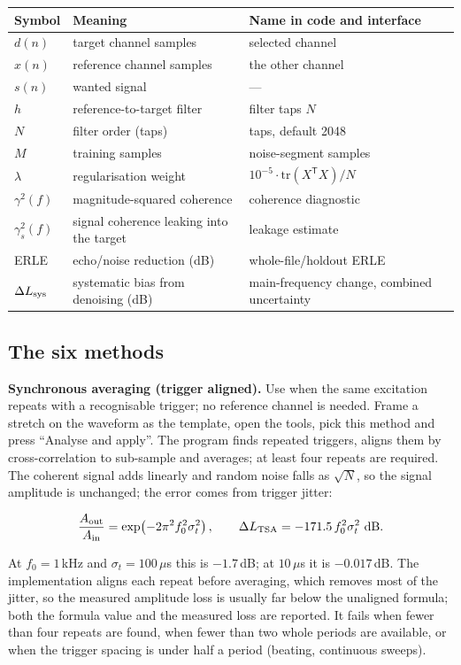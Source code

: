 \documentclass[UTF8,a4paper,12pt]{ctexart}
\begin{document}
\begin{longtable}{@{}lll@{}}
\toprule
Symbol & Meaning & Name in code and interface \\
\midrule
\endhead
$d(n)$ & target channel samples & selected channel \\
$x(n)$ & reference channel samples & the other channel \\
$s(n)$ & wanted signal & --- \\
$h$ & reference-to-target filter & filter taps $N$ \\
$N$ & filter order (taps) & taps, default 2048 \\
$M$ & training samples & noise-segment samples \\
$\lambda$ & regularisation weight & $10^{-5}\cdot\mathrm{tr}(X^{\mathsf T}X)/N$ \\
$\gamma^2(f)$ & magnitude-squared coherence & coherence diagnostic \\
$\gamma_s^2(f)$ & signal coherence leaking into the target & leakage estimate \\
ERLE & echo/noise reduction (dB) & whole-file/holdout ERLE \\
$\Delta L_{\rm sys}$ & systematic bias from denoising (dB) & main-frequency change, combined uncertainty \\
\bottomrule
\end{longtable}

\subsection{The six methods}

\textbf{Synchronous averaging (trigger aligned).} Use when the same excitation repeats with a recognisable trigger; no reference channel is needed. Frame a stretch on the waveform as the template, open the tools, pick this method and press ``Analyse and apply''. The program finds repeated triggers, aligns them by cross-correlation to sub-sample and averages; at least four repeats are required. The coherent signal adds linearly and random noise falls as $\sqrt{N}$, so the signal amplitude is unchanged; the error comes from trigger jitter:

\[
\frac{A_{\rm out}}{A_{\rm in}}=\exp\!\left(-2\pi^{2}f_0^{2}\sigma_t^{2}\right),
\qquad
\Delta L_{\rm TSA}=-171.5\,f_0^{2}\sigma_t^{2}\ {\rm dB}.
\]

At $f_0=1$\,kHz and $\sigma_t=100\,\mu$s this is $-1.7$\,dB; at $10\,\mu$s it is $-0.017$\,dB. The implementation aligns each repeat before averaging, which removes most of the jitter, so the measured amplitude loss is usually far below the unaligned formula; both the formula value and the measured loss are reported. It fails when fewer than four repeats are found, when fewer than two whole periods are available, or when the trigger spacing is under half a period (beating, continuous sweeps).
\end{document}
